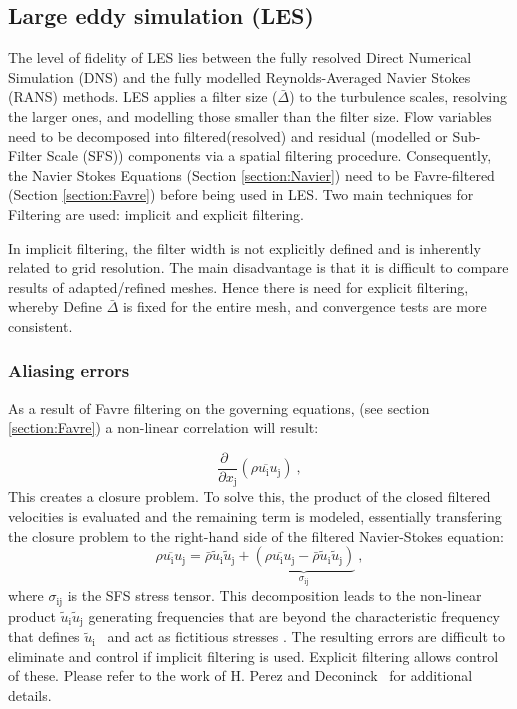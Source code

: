 \subsection{Large eddy simulation (LES)}
The level of fidelity of LES lies between the fully resolved Direct Numerical Simulation (DNS) and the fully modelled Reynolds-Averaged Navier Stokes (RANS) methods. LES applies a filter size ($\bar{\Delta}$) to the turbulence scales, resolving the larger ones, and modelling those smaller than the filter size. Flow variables need to be decomposed into filtered(resolved) and residual (modelled or Sub-Filter Scale (SFS)) components via a spatial filtering procedure. Consequently, the Navier Stokes Equations (Section \ref{section:Navier}) need to be Favre-filtered (Section \ref{section:Favre}) before being used in LES. Two main techniques for Filtering are used: implicit and explicit filtering.\par  

In implicit filtering, the filter width is not explicitly defined and is inherently related to grid resolution. The main disadvantage is that it is difficult to compare results of adapted/refined meshes. Hence there is need for explicit filtering, whereby Define $\bar{\Delta} $ is fixed for the entire mesh, and convergence tests are more consistent. \cite{HPerez:2011, Deconinck:2008}


\subsubsection{Aliasing errors} \label{section:aliasing_errors}
As a result of Favre filtering on the governing equations, (see section \ref{section:Favre}) a non-linear correlation will result:\par
\begin{equation}
 \frac{\partial \;\;}{\partial x_\mathrm{j}} (\overline{\rho u_\mathrm{i} u_\mathrm{j}}) \: ,
 \end{equation}
This creates a closure problem. To solve this, the product of the closed filtered velocities is evaluated and the remaining term is modeled, essentially transfering the closure problem to the right-hand side of the filtered Navier-Stokes equation:
\begin{equation}
\overline{\rho u_\mathrm{i} u_\mathrm{j}} = \bar{\rho} \tilde{u}_\mathrm{i} \tilde{u}_\mathrm{j} 
+\underbrace{ (\overline{\rho u_\mathrm{i} u_\mathrm{j}} - \bar{\rho} \tilde{u}_\mathrm{i} \tilde{u}_\mathrm{j} ) }_{\sigma_\mathrm{ij}} \: ,
\end{equation}
where $\sigma_\mathrm{ij}$ is the SFS stress tensor. This decomposition leads to the non-linear product $\tilde{u}_\mathrm{i} \tilde{u}_\mathrm{j}$ generating frequencies that are beyond the characteristic frequency that defines $\tilde{u}_\mathrm{i}$~ and act as fictitious stresses \cite{Lund:03}.
The resulting errors are difficult to eliminate and control if implicit filtering is used. Explicit filtering allows control of these. Please refer to the work of H. Perez \cite{HPerez:2011} and Deconinck~\cite{Deconinck:2008} for additional details.\par

